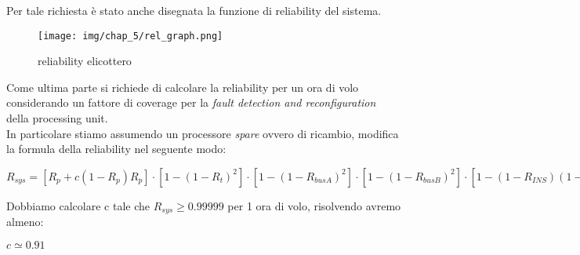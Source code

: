 Per tale richiesta è stato anche disegnata la funzione di reliability del sistema.\\
\begin{figure}[H]
    \centering
    \texttt{[image: img/chap\_5/rel\_graph.png]}
    \caption{reliability elicottero}
    \label{fig:graph_rel}
\end{figure}
\noindent
Come ultima parte si richiede di calcolare la reliability per un ora di volo considerando un fattore di coverage per la \textit{fault detection and reconfiguration} della processing unit.\\
In particolare stiamo assumendo un processore \textit{spare} ovvero di ricambio, modifica la formula della reliability nel seguente modo:
\begin{center}
    $
    R_{sys} = [R_p+c(1-R_p)R_p] \cdot [1-(1-R_t)^2] \cdot [1-(1-R_{busA})^2] \cdot [1-(1-R_{busB})^2] \cdot [1-(1-R_{INS})(1-R_D)(1-(1-R_{AHRS})^3]
    $
\end{center}
Dobbiamo calcolare c tale che $R_{sys} \geq 0.99999$ per 1 ora di volo, risolvendo avremo almeno: 
\begin{center}
    $
        c \simeq 0.91
    $
\end{center}